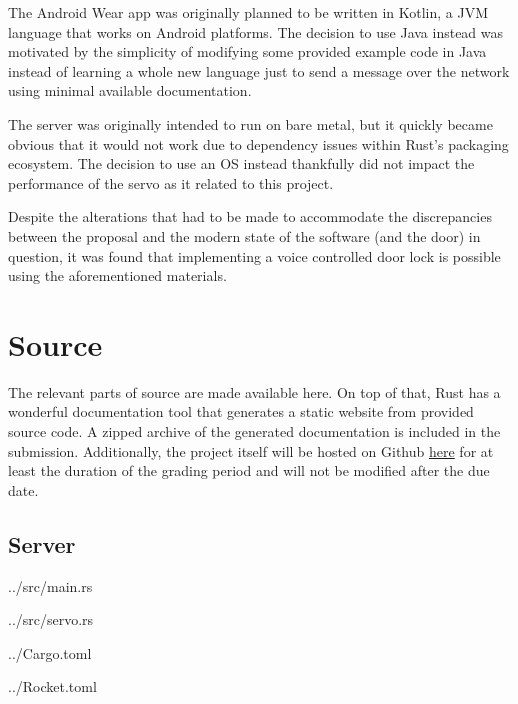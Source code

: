 \documentclass[a4paper]{article}
\begin{document}
The Android Wear app was originally planned to be written in Kotlin, a JVM language that works on Android platforms.
The decision to use Java instead was motivated by the simplicity of modifying some provided example code in Java instead of learning a whole new language just to send a message over the network using minimal available documentation.

The server was originally intended to run on bare metal, but it quickly became obvious that it would not work due to dependency issues within Rust's packaging ecosystem.
The decision to use an OS instead thankfully did not impact the performance of the servo as it related to this project.


Despite the alterations that had to be made to accommodate the discrepancies between the proposal and the modern state of the software (and the door) in question,
it was found that implementing a voice controlled door lock is possible using the aforementioned materials.


\section{Source}\label{sec:source}
The relevant parts of source are made available here.
On top of that, Rust has a wonderful documentation tool that generates a static website from provided source code.
A zipped archive of the generated documentation is included in the submission.
Additionally, the project itself will be hosted on Github \href{https://github.com/hgzimmerman/CMPE-240-Sesame-Server}{here} for at least the duration of the grading period and will not be modified after the due date.

\subsection{Server}\label{subsec:server}


{../src/main.rs}


{../src/servo.rs}



{../Cargo.toml}


{../Rocket.toml}
\end{document}
